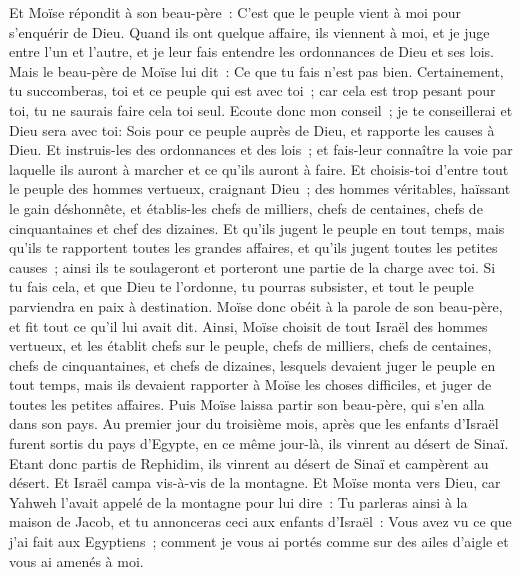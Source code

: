 \begin{multicols}{2}
 Et Moïse répondit à son beau-père~: C'est que le peuple vient à moi pour s'enquérir de Dieu.
Quand ils ont quelque affaire, ils viennent à moi, et je juge entre l'un et l'autre, et je leur fais entendre les ordonnances de Dieu et ses lois.
Mais le beau-père de Moïse lui dit~: Ce que tu fais n'est pas bien.
Certainement, tu succomberas, toi et ce peuple qui est avec toi~; car cela est trop pesant pour toi, tu ne saurais faire cela toi seul.
Ecoute donc mon conseil~; je te conseillerai et Dieu sera avec toi: Sois pour ce peuple auprès de Dieu, et rapporte les causes à Dieu.
Et instruis-les des ordonnances et des lois~; et fais-leur connaître la voie par laquelle ils auront à marcher et ce qu'ils auront à faire.
Et choisis-toi d'entre tout le peuple des hommes vertueux, craignant Dieu~; des hommes véritables, haïssant le gain déshonnête, et établis-les chefs de milliers, chefs de centaines, chefs de cinquantaines et chef des dizaines.
Et qu'ils jugent le peuple en tout temps, mais qu'ils te rapportent toutes les grandes affaires, et qu'ils jugent toutes les petites causes~; ainsi ils te soulageront et porteront une partie de la charge avec toi.
Si tu fais cela, et que Dieu te l'ordonne, tu pourras subsister, et tout le peuple parviendra en paix à destination.
Moïse donc obéit à la parole de son beau-père, et fit tout ce qu'il lui avait dit.
Ainsi, Moïse choisit de tout Israël des hommes vertueux, et les établit chefs sur le peuple, chefs de milliers, chefs de centaines, chefs de cinquantaines, et chefs de dizaines,
lesquels devaient juger le peuple en tout temps, mais ils devaient rapporter à Moïse les choses difficiles, et juger de toutes les petites affaires.
Puis Moïse laissa partir son beau-père, qui s'en alla dans son pays.
\VerseOne{}Au premier jour du troisième mois, après que les enfants d'Israël furent sortis du pays d'Egypte, en ce même jour-là, ils vinrent au désert de Sinaï.
Etant donc partis de Rephidim, ils vinrent au désert de Sinaï et campèrent au désert. Et Israël campa vis-à-vis de la montagne.
Et Moïse monta vers Dieu, car Yahweh l'avait appelé de la montagne pour lui dire~: Tu parleras ainsi à la maison de Jacob, et tu annonceras ceci aux enfants d'Israël~:
Vous avez vu ce que j'ai fait aux Egyptiens~; comment je vous ai portés comme sur des ailes d'aigle et vous ai amenés à moi.

\end{multicols}
